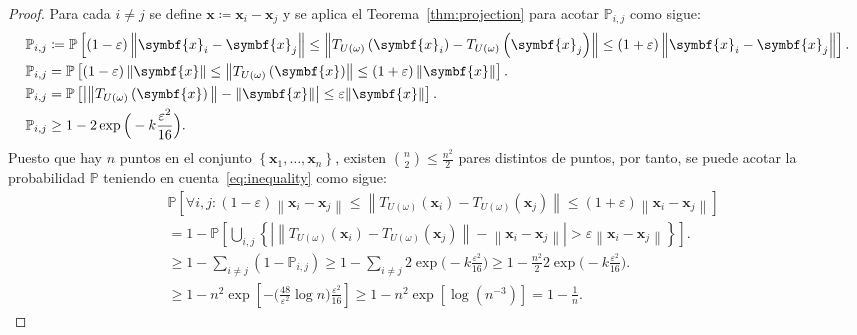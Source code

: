 \begin{proof}
	Para cada $i\neq j$ se define
	$\symbf{x}\coloneqq\symbf{x}_i-\symbf{x}_{j}$ y se aplica el
	Teorema~\ref{thm:projection} para acotar $\mathbb{P}_{i,j}$ como
	sigue:
	\begin{align}
		\mathbb{P}_{i,j} & \coloneqq
		\mathbb{P}
		\left[
			\left(1-\varepsilon\right)
			\left\|
			\symbf{x}_{i}-
			\symbf{x}_{j}
			\right\|\leq
			\left\|
			T_{U\left(\omega\right)}\left(\symbf{x}_{i}\right)-
			T_{U\left(\omega\right)}\left(\symbf{x}_{j}\right)\right\|
			\leq
			\left(1+\varepsilon\right)
			\left\|
			\symbf{x}_{i}-
			\symbf{x}_{j}
			\right\|
		\right].        \notag                  \\
		\mathbb{P}_{i,j} & =
		\mathbb{P}
		\left[
			\left(1-\varepsilon\right)
			\left\|\symbf{x}\right\|\leq
			\left\|
			T_{U\left(\omega\right)}\left(\symbf{x}\right)
			\right\|\leq
			\left(1+\varepsilon\right)
			\left\|\symbf{x}\right\|
		\right].           \notag               \\
		\mathbb{P}_{i,j} & =
		\mathbb{P}
		\left[
			\left|
			\big\|
			T_{U\left(\omega\right)}
			\left(\symbf{x}\right)
			\big\|-
			\left\|
			\symbf{x}
			\right\|
			\right|\leq
		\varepsilon\|\symbf{x}\|\right]. \notag \\
		\mathbb{P}_{i,j} & \geq
		1-
		2\exp
		\Big(
		-k\frac{\varepsilon^{2}}{16}
		\Big).\label{eq:inequality}
	\end{align}
	Puesto que hay $n$ puntos en el conjunto
	$\left\{\symbf{x}_{1},\dotsc,\symbf{x}_{n}\right\}$, existen
	$\binom{n}{2}\leq\frac{n^{2}}{2}$ pares distintos de puntos, por
	tanto, se puede acotar la probabilidad $\mathbb{P}$ teniendo en
	cuenta~\eqref{eq:inequality} como sigue:
	\begin{align*}
		 &
		\mathbb{P}
		\left[
			\forall i,j:
			\left(1-\varepsilon\right)
			\left\|
			\symbf{x}_{i}-
			\symbf{x}_{j}
			\right\|\leq
			\left\|
			T_{U\left(\omega\right)}\left(\symbf{x}_{i}\right)-
			T_{U\left(\omega\right)}\left(\symbf{x}_{j}\right)
			\right\|\leq
			\left(1+\varepsilon\right)
			\left\|\symbf{x}_{i}-\symbf{x}_{j}\right\|
		\right]                                    \\
		 & =
		1-\mathbb{P}
		\left[
			\bigcup_{i,j}
			\left\{
			\left|
			\left\|
			T_{U\left(\omega\right)}\left(\symbf{x}_{i}\right)-
			T_{U\left(\omega\right)}\left(\symbf{x}_{j}\right)
			\right\|-
			\left\|
			\symbf{x}_{i}-
			\symbf{x}_{j}
			\right\|
			\right|>
			\varepsilon
			\left\|
			\symbf{x}_{i}-\symbf{x}_{j}
			\right\|
			\right\}
		\right].                                   \\
		 & \geq
		1-
		\sum_{i\neq j}
		\left(1-\mathbb{P}_{i,j}\right)\geq
		1-\sum_{i\neq j}
		2\exp\Big(-k\frac{\varepsilon^2}{16}\Big)\geq
		1-\frac{n^2}{2}
		2\exp\Big(-k\frac{\varepsilon^2}{16}\Big). \\
		 & \geq
		1-n^{2}
		\exp
		\left[
			-\Big(\frac{48}{\varepsilon^2}\log n\Big)
			\frac{\varepsilon^2}{16}
			\right]\geq
		1-
		n^{2}
		\exp
		\left[\log\left(n^{-3}\right)\right]=
		1-\frac{1}{n}.
	\end{align*}
\end{proof}

